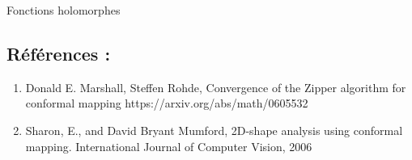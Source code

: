 \documentclass[]{article}
\begin{document}
Fonctions holomorphes

\subsection{Références :}\label{ruxe9fuxe9rences}

\begin{enumerate}
\def\labelenumi{\arabic{enumi}.}
\item
  Donald E. Marshall, Steffen Rohde, Convergence of the Zipper algorithm
  for conformal mapping https://arxiv.org/abs/math/0605532
\item
  Sharon, E., and David Bryant Mumford, 2D-shape analysis using
  conformal mapping. International Journal of Computer Vision, 2006
\end{enumerate}
\end{document}

